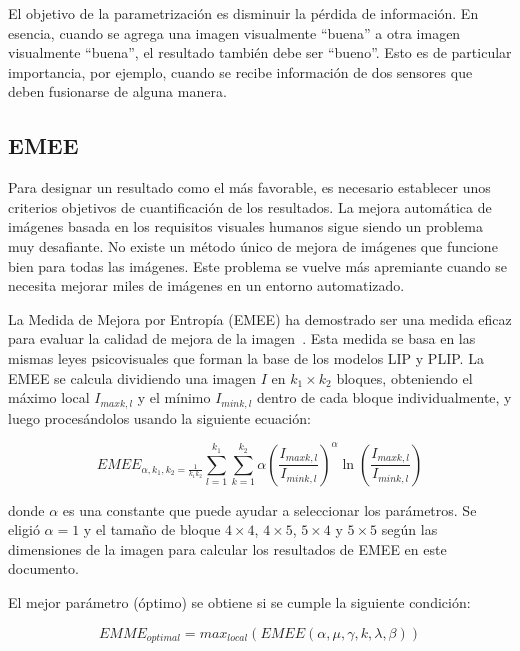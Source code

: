 El objetivo de la parametrizaci\'on es disminuir la p\'erdida de informaci\'on. En esencia, cuando se agrega una imagen visualmente ``buena'' a otra imagen visualmente ``buena'', el resultado también debe ser ``bueno''. Esto es de particular importancia, por ejemplo, cuando se recibe información de dos sensores que deben fusionarse de alguna manera.

\subsection{EMEE}

Para designar un resultado como el más favorable, es necesario establecer unos criterios objetivos de cuantificación de los resultados. La mejora automática de imágenes basada en los requisitos visuales humanos sigue siendo un problema muy desafiante. No existe un método único de mejora de imágenes que funcione bien para todas las imágenes. Este problema se vuelve más apremiante cuando se necesita mejorar miles de imágenes en un entorno automatizado.

La Medida de Mejora por Entropía (EMEE) ha demostrado ser una medida eficaz para evaluar la calidad de mejora de la imagen~\cite{agaian2000new}. Esta medida se basa en las mismas leyes psicovisuales que forman la base de
los modelos LIP y PLIP. La EMEE se calcula dividiendo una imagen $I$ en $k_1 \times k_2$ bloques, obteniendo el máximo local $I_{max k,l}$ y el mínimo $I_{min k,l}$ dentro de cada bloque individualmente, y luego procesándolos usando la siguiente ecuación:

\begin{equation}
	\displaystyle EMEE_{\alpha,k_1,k_2=\frac{1}{k_1k_2}}\sum_{l=1}^{k_1}\sum_{k=1}^{k_2}\alpha\left(\frac{I_{max k,l}}{I_{min k,l}}\right)^\alpha\ln\left(\frac{I_{max k,l}}{I_{min k,l}}\right)
\end{equation}

donde $\alpha$ es una constante que puede ayudar a seleccionar los parámetros. Se eligi\'o $\alpha = 1$ y el tamaño de bloque $4 \times 4$, $4 \times 5$, $5 \times 4$ y $5 \times 5$ seg\'un las dimensiones de la imagen para calcular los resultados de EMEE en este documento.

El mejor parámetro (óptimo) se obtiene si se cumple la siguiente condición:

\begin{equation}
	EMME_{optimal}=max_{local}(EMEE(\alpha, \mu, \gamma, k, \lambda, \beta))
\end{equation}

